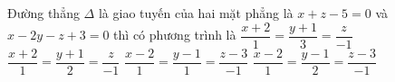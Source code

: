 \begin{ex}%
	Đường thẳng $\Delta$ là giao tuyến của hai mặt phẳng là $x+z-5=0$ và $x-2y-z+3=0$ thì có phương trình là
	\choice
	{$\dfrac{x+2}{1}=\dfrac{y+1}{3}=\dfrac{z}{-1}$}
	{$\dfrac{x+2}{1}=\dfrac{y+1}{2}=\dfrac{z}{-1}$}
	{\True $\dfrac{x-2}{1}=\dfrac{y-1}{1}=\dfrac{z-3}{-1}$}
	{$\dfrac{x-2}{1}=\dfrac{y-1}{2}=\dfrac{z-3}{-1}$}
\end{ex}

